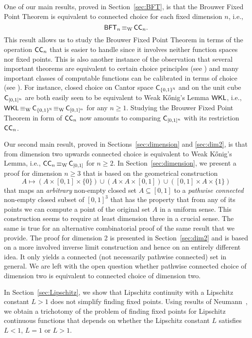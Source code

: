 \documentclass[a4paper]{amsart}
\def\IN{{\mathbb{N}}}
\def\In{\subseteq}
\def\WKL{\text{\rm\sffamily WKL}}
\def\BFT{\mbox{\rm\sffamily BFT}}
\def\C{\mbox{\rm\sffamily C}}
\def\ConC{\mbox{\rm\sffamily CC}}
\def\equivW{\mathop{\equiv_{\mathrm{W}}}}
\theoremstyle{definition}
\begin{document}
One of our main results, proved in Section~\ref{sec:BFT}, is that the Brouwer Fixed Point Theorem is equivalent to connected choice for 
each fixed dimension $n$, i.e., 
\[\BFT_n\equivW\ConC_n.\] 
This result allows us to study the Brouwer Fixed
Point Theorem in terms of the operation $\ConC_n$ that is easier to handle since
it involves neither function spaces nor fixed points. This is also another instance of the observation
that several important theorems are equivalent to certain choice principles (see \cite{BG11a}) and
many important classes of computable functions can be calibrated in terms of choice (see \cite{BBP12}).
For instance, closed choice on Cantor space $\C_{\{0,1\}^\IN}$ and on the unit cube $\C_{[0,1]^n}$ are both
easily seen to be equivalent to Weak K\H{o}nig's Lemma $\WKL$, i.e., $\WKL\equivW\C_{\{0,1\}^\IN}\equivW\C_{[0,1]^n}$ 
for any $n\geq1$. 
Studying the Brouwer Fixed  Point Theorem in form of $\ConC_n$ now amounts to comparing
$\C_{[0,1]^n}$ with its restriction $\ConC_n$.

Our second main result, proved in Sections~\ref{sec:dimension} and \ref{sec:dim2},
is that from dimension two upwards connected choice is equivalent to
Weak K\H{o}nig's Lemma, i.e., $\ConC_n\equivW\C_{[0,1]}$ for $n\geq2$.
In Section~\ref{sec:dimension}, we present a proof for dimension $n\geq3$
that is based on the geometrical construction
\[A\mapsto(A\times[0,1]\times\{0\})\cup(A\times A\times[0,1])\cup([0,1]\times A\times\{1\})\]
that maps an {\em arbitrary} non-empty closed set $A\In[0,1]$ to a {\em pathwise connected} non-empty closed subset of $[0,1]^3$ 
that has the property that from any of its points we can compute a point of the original set $A$ in a uniform sense.
This construction seems to require at least dimension three in a crucial sense.
The same is true for an alternative combinatorial proof of the same result that we provide.
The proof for dimension 2 is presented in Section~\ref{sec:dim2} and is based on 
a more involved inverse limit construction and hence on an entirely different idea.
It only yields a connected (not necessarily pathwise connected) set in general. 
We are left with the open question whether pathwise connected choice of dimension two is 
equivalent to connected choice of dimension two. 

In Section~\ref{sec:Lipschitz}, we show that Lipschitz continuity with a Lipschitz constant $L>1$ does
not simplify finding fixed points. Using results of Neumann~\cite{Neu15}, we obtain a trichotomy
of the problem of finding fixed points for Lipschitz continuous functions that depends on 
whether the Lipschitz constant $L$ satisfies $L<1$, $L=1$ or $L>1$.
\end{document}
